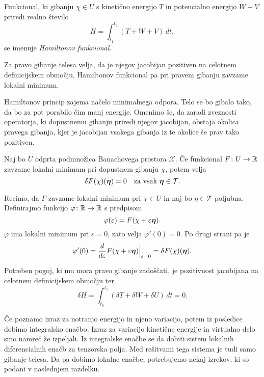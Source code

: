 \begin{definicija}
	Funkcional, ki gibanju $\chi\in U$ s kinetično energijo $T$ in potencialno
	energijo $W+V$ priredi realno število
	\[
		H=\int_{t_1}^{t_2}(T+W+V)\,dt,
	\]
	se imenuje \emph{Hamiltonov funkcional}.
\end{definicija}

\begin{aksiom}
	Za pravo gibanje telesa velja, da je njegov jacobijan pozitiven na
	celotnem definicijskem območju, Hamiltonov funkcional pa pri pravem gibanju
	zavzame lokalni minimum.
\end{aksiom}

Hamiltonov princip zajema načelo minimalnega odpora. Telo se bo gibalo tako, da
bo za pot porabilo čim manj energije. Omenimo še, da zaradi zveznosti operatorja,
ki dopustnemu gibanju priredi njegov jacobijan, obstaja okolica pravega gibanja,
kjer je jacobijan vsakega gibanja iz te okolice še prav tako pozitiven.

\begin{trditev}
	Naj bo $U$ odprta podmnožica Banachovega prostora $\mathcal{X}$.
	Če funkcional $F\colon U\to\mathbb R$ zavzame lokalni minimum pri dopustnem gibanju $\chi$, potem velja
	\[ \delta F(\chi)(\vek{\eta})=0\quad\textrm{za vsak}\ \vek{\eta}\in\mathcal{T}. \]
\end{trditev}

\proof
	Recimo, da $F$ zavzame lokalni minimum pri $\chi\in U$ in naj bo $\eta\in\mathcal{T}$ poljubna.
	Definirajmo funkcijo $\varphi\colon\mathbb R\to\mathbb R$ s predpisom
	\[ \varphi(\varepsilon)=F(\chi+\varepsilon\boldsymbol \eta). \]
	$\varphi$ ima lokalni minimum pri $\varepsilon=0$, zato velja $\varphi'(0)=0.$
	Po drugi strani pa je
	\[
		\varphi'(0)=\frac{d}{d\varepsilon}F(\chi+\varepsilon\boldsymbol \eta)\Big|_{\varepsilon=0}=
		\delta F(\chi)(\boldsymbol \eta).
	\]
\endproof

\begin{posledica} \label{p:varham0}
	Potreben pogoj, ki mu mora pravo gibanje zadoščati, je pozitivnost jacobijana
	na celotnem definicijskem območju ter
	\[ \delta H = \int_{t_0}^{t_1}(\delta T+\delta W+\delta U)\,dt = 0. \]
\end{posledica}

Če poznamo izraz za notranjo energijo in njeno variacijo, potem iz posledice
dobimo integralsko enačbo. Izraz za variacijo kinetične energije in virtualno delo 
smo namreč že izpeljali. Iz integralske enačbe se da dobiti sistem lokalnih diferencialnih enačb
za tenzorska polja. Med rešitvami tega sistema je tudi samo gibanje telesa.
Da pa dobimo lokalne enačbe, potrebujemo nekaj izrekov, ki so podani v naslednjem razdelku.



